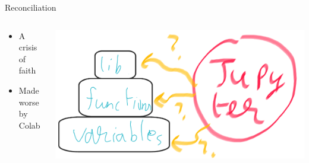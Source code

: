 \documentclass[bigger,unknownkeysallowed,aspectratio=169,red,colorblocks]{beamer}
\begin{document}
\begin{frame}[label={sec:org03b941f}]{Reconciliation}
\begin{columns}
\begin{column}{0.3\columnwidth}
\begin{itemize}
\item A crisis of \alert{faith}
\item Made worse by Colab
\end{itemize}
\end{column}

\begin{column}{0.7\columnwidth}
\begin{center}
\includegraphics[width=.9\linewidth]{images/Reconciliation/2020-09-20_06-18-07_screenshot.png}
\end{center}
\end{column}
\end{columns}
\end{frame}
\end{document}
